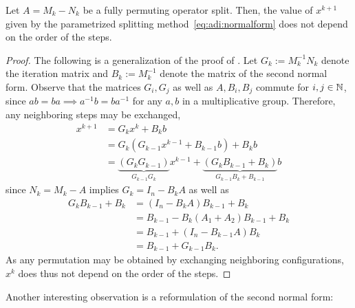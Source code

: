 \begin{proposition}
\label{thm:adi:permutation}
  Let $A = M_k - N_k$ be a fully permuting operator split.
  Then, the value of $x^{k+1}$ given by the parametrized splitting method~\eqref{eq:adi:normalform}
  does not depend on the order of the steps.
\end{proposition}
\begin{proof}
  The following is a generalization of the proof of \cite[Theorem~4.1]{Li2002}.
  Let $G_k := M_k^{-1} N_k$ denote the iteration matrix
  and $B_k := M_k^{-1}$ denote the matrix of the second normal form.
  Observe that the matrices $G_i, G_j$ as well as $A, B_i, B_j$ commute for $i,j\in\mathbb{N}$,
  since $ab=ba \implies a^{-1}b = ba^{-1}$ for any $a,b$ in a multiplicative group.
  Therefore, any neighboring steps may be exchanged,
  \begin{align*}
    x^{k+1}
    &= G_k x^k + B_k b \\
    &= G_k (G_{k-1} x^{k-1} + B_{k-1} b) + B_k b \\
    &= \underbrace{
      (G_k G_{k-1})
    }_{
      G_{k-1} G_k
    } x^{k-1} + \underbrace{
      (G_k B_{k-1} + B_k)
    }_{
      G_{k-1} B_k + B_{k-1}
    } b
  \end{align*}
  since $N_k = M_k - A$ implies $G_k = I_n - B_k A$ as well as
  \begin{align*}
    G_k B_{k-1} + B_k
    &= (I_n - B_k A) B_{k-1} + B_k \\
    &= B_{k-1} - B_k (A_1+A_2) B_{k-1} + B_k \\
    &= B_{k-1} + (I_n - B_{k-1} A) B_k \\
    &= B_{k-1} + G_{k-1} B_k
    .
  \end{align*}
  As any permutation may be obtained by exchanging neighboring configurations,
  $x^k$ does thus not depend on the order of the steps.
\end{proof}

Another interesting observation is a reformulation of the second normal form:

